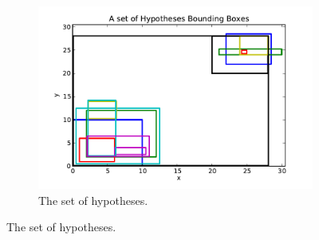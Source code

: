 \begin{figure}[hbt]
\begin{subfigure}[b]{0.32\textwidth}
            \caption{}
            \label{fig:slvqs_qs2}
    \end{subfigure}
    ~ %
    \begin{subfigure}[b]{0.32\textwidth}
        \centering
        \includegraphics[width=\textwidth]{visBB}
        \caption{The set of hypotheses.}
        \label{fig:slvqs_bb}
    \end{subfigure}%


\end{figure}
